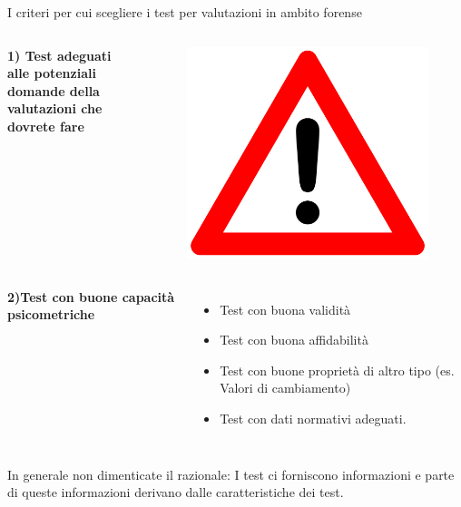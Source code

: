 \documentclass[
  ignorenonframetext,
]{beamer}
\begin{document}
\begin{frame}{I criteri per cui scegliere i test per valutazioni in
ambito forense}
\label{i-criteri-per-cui-scegliere-i-test-per-valutazioni-in-ambito-forense}
\begin{columns}

\textbf{1) Test adeguati alle potenziali domande della valutazioni che dovrete fare}


\begin{figure}
    \includegraphics[scale=0.04]{Figures/triangle.png}
\end{figure}

\end{columns}

\pause

\begin{columns}

\textbf{2)Test con buone capacità psicometriche}
\begin{itemize}[<*>] 
  \item Test con buona validità
  \item Test con buona affidabilità
  \item Test con buone proprietà di altro tipo (es. Valori di cambiamento)
  \item Test con dati normativi adeguati.
\end{itemize}

\end{columns}

\vspace{2em}

In generale non dimenticate il razionale: I test ci forniscono
informazioni e parte di queste informazioni derivano dalle
caratteristiche dei test.
\end{frame}
\end{document}
